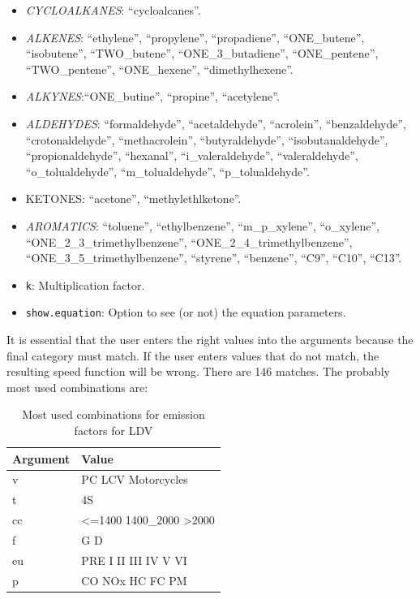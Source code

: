 \documentclass[12pt,graybox,envcountchap,sectrefs]{krantz}
\theoremstyle{definition}
\theoremstyle{definition}
\theoremstyle{definition}
\theoremstyle{remark}
\begin{document}
\begin{itemize}
\item
  \emph{CYCLOALKANES}: ``cycloalcanes''.
\item
  \emph{ALKENES}: ``ethylene'', ``propylene'', ``propadiene'',
  ``ONE\_butene'', ``isobutene'', ``TWO\_butene'',
  ``ONE\_3\_butadiene'', ``ONE\_pentene'', ``TWO\_pentene'',
  ``ONE\_hexene'', ``dimethylhexene''.
\item
  \emph{ALKYNES}:``ONE\_butine'', ``propine'', ``acetylene''.
\item
  \emph{ALDEHYDES}: ``formaldehyde'', ``acetaldehyde'', ``acrolein'',
  ``benzaldehyde'', ``crotonaldehyde'', ``methacrolein'',
  ``butyraldehyde'', ``isobutanaldehyde'', ``propionaldehyde'',
  ``hexanal'', ``i\_valeraldehyde'', ``valeraldehyde'',
  ``o\_tolualdehyde'', ``m\_tolualdehyde'', ``p\_tolualdehyde''.
\item
  KETONES: ``acetone'', ``methylethlketone''.
\item
  \emph{AROMATICS}: ``toluene'', ``ethylbenzene'', ``m\_p\_xylene'',
  ``o\_xylene'', ``ONE\_2\_3\_trimethylbenzene'',
  ``ONE\_2\_4\_trimethylbenzene'', ``ONE\_3\_5\_trimethylbenzene'',
  ``styrene'', ``benzene'', ``C9'', ``C10'', ``C13''.
\item
  \texttt{k}: Multiplication factor.
\item
  \texttt{show.equation}: Option to see (or not) the equation
  parameters.
\end{itemize}

It is essential that the user enters the right values into the arguments
because the final category must match. If the user enters values that do
not match, the resulting speed function will be wrong. There are 146
matches. The probably most used combinations are:

\begin{table}

\caption{\label{tab:unnamed-chunk-45}Most used combinations for emission factors for LDV}
\centering
\begin{tabular}[t]{ll}
\toprule
Argument & Value\\
\midrule
v & PC LCV Motorcycles\\
t & 4S\\
cc & <=1400 1400\_2000 >2000\\
f & G D\\
eu & PRE I II III IV V VI\\
p & CO NOx HC FC PM\\
\bottomrule
\end{tabular}
\end{table}
\end{document}
